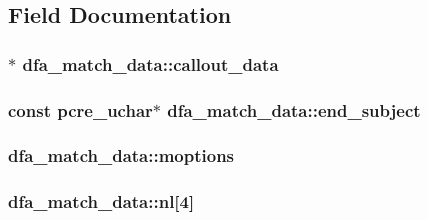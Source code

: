 \subsection{Field Documentation}
\subsubsection[{\texorpdfstring{callout\+\_\+data}{callout_data}}]{$\ast$ dfa\+\_\+match\+\_\+data\+::callout\+\_\+data}\hypertarget{structdfa__match__data_a2add77eaca1d1c46cb999ebc7df73a68}{}\label{structdfa__match__data_a2add77eaca1d1c46cb999ebc7df73a68}
\subsubsection[{\texorpdfstring{end\+\_\+subject}{end_subject}}]{\setlength{\rightskip}{0pt plus 5cm}const {\bf pcre\+\_\+uchar}$\ast$ dfa\+\_\+match\+\_\+data\+::end\+\_\+subject}\hypertarget{structdfa__match__data_a1b197dff55a95ad48dc3753745d40e0b}{}\label{structdfa__match__data_a1b197dff55a95ad48dc3753745d40e0b}
\subsubsection[{\texorpdfstring{moptions}{moptions}}]{ dfa\+\_\+match\+\_\+data\+::moptions}\hypertarget{structdfa__match__data_a717b432620e3482e13f8c78744a0b4a8}{}\label{structdfa__match__data_a717b432620e3482e13f8c78744a0b4a8}
\subsubsection[{\texorpdfstring{nl}{nl}}]{ dfa\+\_\+match\+\_\+data\+::nl\mbox{[}4\mbox{]}}\hypertarget{structdfa__match__data_a33c68961f4b0b4f16e9c7482a5a6db65}{}\label{structdfa__match__data_a33c68961f4b0b4f16e9c7482a5a6db65}
